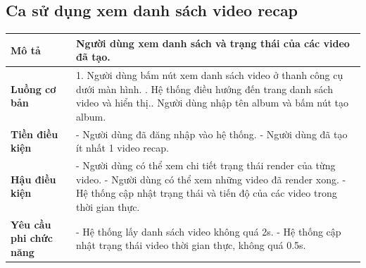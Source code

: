 \subsection{Ca sử dụng xem danh sách video recap}

\vspace{0.5cm}

\noindent 
\begin{tabularx}{\linewidth}{| l | X |} 
\hline 
\textbf{Mô tả} & Người dùng xem danh sách và trạng thái của các video đã tạo. \\
\hline 
\textbf{Luồng cơ bản} & 1. Người dùng bấm nút xem danh sách video ở thanh công cụ dưới màn hình. \newline
                       2. Hệ thống điều hướng đến trang danh sách video và hiển thị.\newline
                       3. Người dùng nhập tên album và bấm nút tạo album. \\
\hline 
\textbf{Tiền điều kiện} & - Người dùng đã đăng nhập vào hệ thống. \newline
                            - Người dùng đã tạo ít nhất 1 video recap. \\
\textbf{Hậu điều kiện} & - Người dùng có thể xem chi tiết trạng thái render của từng video. \newline
                        - Người dùng có thể xem những video đã render xong. \newline
                        - Hệ thống cập nhật trạng thái và tiến độ của các video trong thời gian thực. \\
\hline 
\textbf{Yêu cầu phi chức năng} & - Hệ thống lấy danh sách video không quá 2s. \newline
                        - Hệ thống cập nhật trạng thái video thời gian thực, không quá 0.5s. \\   
\hline 
\end{tabularx}

\vspace{0.8cm}

